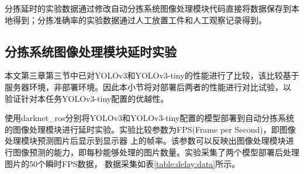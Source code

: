分拣延时的实验数据通过修改自动分拣系统图像处理模块代码直接将数据保存到本地得到；分拣准确率的实验数据通过人工放置工件和人工观察记录得到。


\subsection{分拣系统图像处理模块延时实验}

本文第三章第三节中已对YOLOv3和YOLOv3-tiny的性能进行了比较，该比较基于服务器环境，非部署环境。因此本小节将对部署后两者的性能进行对比试验，以
验证针对本任务YOLOv3-tiny配置的优越性。

使用darknet\_ros分别将YOLOv3和YOLOv3-tiny配置的模型部署到自动分拣系统的图像处理模块进行延时实验。实验比较参数为FPS(Frame per Second)，即图像处理模块预测图片后显示到显示器
上的帧率。该参数可以反映出图像处理模块进行图像预测的能力，即每秒能够处理的图片数量。实验采集了两个模型部署后处理图片的50个瞬时FPS数据，
数据采集如表\ref{table:delay:data}所示。

